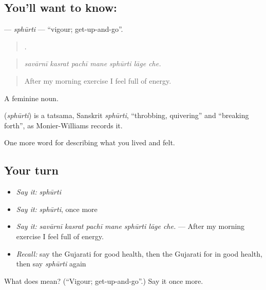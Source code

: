 \subsection*{You'll want to know: }
\textbf{} — \emph{sphūrti} — \textquotedblleft{}vigour; get-up-and-go\textquotedblright{}.

\begin{quote}
      .
\end{quote}

\begin{quote}
\emph{savārnī kasrat pachī mane sphūrti lāge che.}
\end{quote}

\begin{quote}
After my morning exercise I feel full of energy.
\end{quote}

A feminine noun.

\begin{cousinweb}
\textbf{} (\emph{sphūrti}) is a tatsama, Sanskrit \emph{sphūrti}, \textquotedblleft{}throbbing, quivering\textquotedblright{} and \textquotedblleft{}breaking forth\textquotedblright{}, as Monier-Williams records it.
\end{cousinweb}

\begin{grammarlens}[title={What you've built}]
One more word for describing what you lived and felt.
\end{grammarlens}

\subsection*{Your turn}
\begin{itemize}
\raggedright
  \item \emph{Say it:} \emph{sphūrti}
  \item \emph{Say it:} \emph{sphūrti}, once more
  \item \emph{Say it:} \emph{savārnī kasrat pachī mane sphūrti lāge che.} — After my morning exercise I feel full of energy.
  \item \emph{Recall:} say the Gujarati for good health, then the Gujarati for in good health, then say \emph{sphūrti} again
\end{itemize}

\begin{tcolorbox}[breakable,colback=teal!4,colframe=teal!35!black,title={Before you move on}]
What does  mean? (\textquotedblleft{}Vigour; get-up-and-go\textquotedblright{}.) Say it once more.
\end{tcolorbox}
